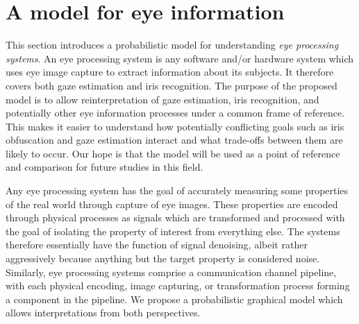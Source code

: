 \section{A model for eye information}
This section introduces a probabilistic model for understanding \emph{eye processing systems}. An eye processing system is any software and/or hardware system which uses eye image capture to extract information about its subjects. It therefore covers both gaze estimation and iris recognition. The purpose of the proposed model is to allow reinterpretation of gaze estimation, iris recognition, and potentially other eye information processes under a common frame of reference. This makes it easier to understand how potentially conflicting goals such as iris obfuscation and gaze estimation interact and what trade-offs between them are likely to occur. Our hope is that the model will be used as a point of reference and comparison for future studies in this field.








Any eye processing system has the goal of accurately measuring some properties of the real world through capture of eye images. These properties are encoded through physical processes as signals which are transformed and processed with the goal of isolating the property of interest from everything else. The systems therefore essentially have the function of signal denoising, albeit rather aggressively because anything but the target property is considered noise. Similarly, eye processing systems comprise a communication channel pipeline, with each physical encoding, image capturing, or transformation process forming a component in the pipeline. We propose a probabilistic graphical model which allows interpretations from both perspectives. 

